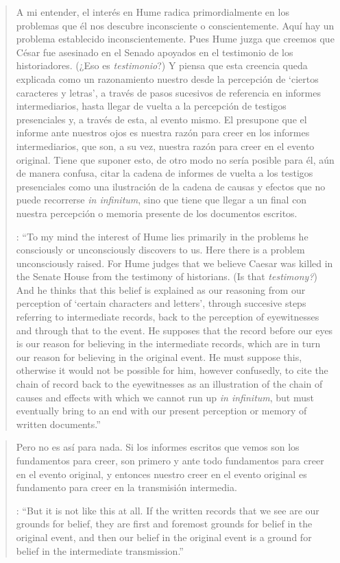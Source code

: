 \blockquote[{\cite[121--122]{anscombe2011plato:humecaus}}: \enquote{To my mind the interest of Hume lies primarily in the problems he consciously or unconsciously discovers to us. Here there is a problem unconsciously raised. For Hume judges that we believe Caesar was killed in the Senate House from the testimony of historians. (Is that \emph{testimony?}) And he thinks that this belief is explained as our reasoning from our perception of `certain characters and letters', through succesive steps referring to intermediate records, back to the perception of eyewitnesses and through that to the event. He supposes that the record before our eyes is our reason for believing in the intermediate records, which are in turn our reason for believing in the original event. He must suppose this, otherwise it would not be possible for him, however confusedly, to cite the chain of record back to the eyewitnesses as an illustration of the chain of causes and effects with which we cannot run up \emph{in infinitum}, but must eventually bring to an end with our present perception or memory of written documents.}]{A mi entender, el interés en Hume radica primordialmente en los problemas que él nos descubre inconsciente o conscientemente. Aquí hay un problema establecido inconscientemente. Pues Hume juzga que creemos que César fue asesinado en el Senado apoyados en el testimonio de los historiadores. (¿Eso es \emph{testimonio}?) Y piensa que esta creencia queda explicada como un razonamiento nuestro desde la percepción de `ciertos caracteres y letras', a través de pasos sucesivos de referencia en informes intermediarios, hasta llegar de vuelta a la percepción de testigos presenciales y, a través de esta, al evento mismo. El presupone que el informe ante nuestros ojos es nuestra razón para creer en los informes intermediarios, que son, a su vez, nuestra razón para creer en el evento original. Tiene que suponer esto, de otro modo no sería posible para él, aún de manera confusa, citar la cadena de informes de vuelta a los testigos presenciales como una ilustración de la cadena de causas y efectos que no puede recorrerse \emph{in infinitum}, sino que tiene que llegar a un final con nuestra percepción o memoria presente de los documentos escritos.}

\blockquote[{\cite[121--122]{anscombe2011plato:humecaus}}: \enquote{But it is not like this at all. If the written records that we see are our grounds for belief, they are first and foremost grounds for belief in the original event, and then our belief in the original event is a ground for belief in the intermediate transmission.}]{Pero no es así para nada. Si los informes escritos que vemos son los fundamentos para creer, son primero y ante todo fundamentos para creer en el evento original, y entonces nuestro creer en el evento original es fundamento para creer en la transmisión intermedia.}

